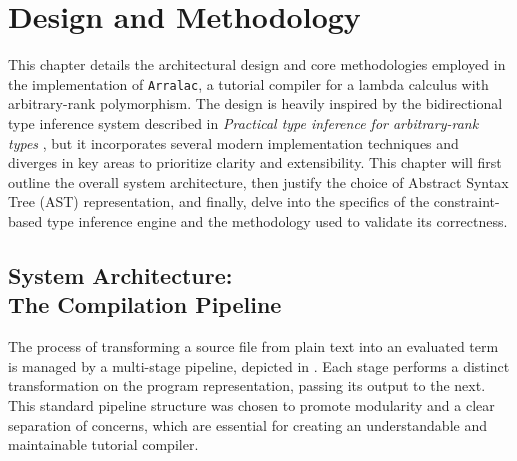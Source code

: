 \chapter{Design and Methodology}
\label{chap:DesignAndMethodology}

This chapter details the architectural design and core methodologies employed in the implementation of \texttt{Arralac}, a tutorial compiler for a lambda calculus with arbitrary-rank polymorphism. The design is heavily inspired by the bidirectional type inference system described in \textit{Practical type inference for arbitrary-rank types} \cite{jones-practical-2007}, but it incorporates several modern implementation techniques and diverges in key areas to prioritize clarity and extensibility. This chapter will first outline the overall system architecture, then justify the choice of Abstract Syntax Tree (AST) representation, and finally, delve into the specifics of the constraint-based type inference engine and the methodology used to validate its correctness.

\section{System Architecture: \\ The Compilation Pipeline}
\label{sec:Design:Pipeline}

The process of transforming a source file from plain text into an evaluated term is managed by a multi-stage pipeline, depicted in . Each stage performs a distinct transformation on the program representation, passing its output to the next. This standard pipeline structure \cite{wits-type-inference-using-constraints} was chosen to promote modularity and a clear separation of concerns, which are essential for creating an understandable and maintainable tutorial compiler.

